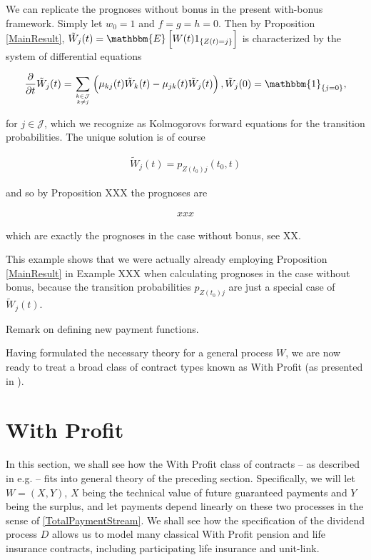 \documentclass{book}
\newcommand{\1}[1]{\mathbbm{1}_{\left\lbrace #1 \right\rbrace}}
\newcommand{\expec}[1][def]{\mathbbm{E} \left[ #1 \right]}
\theoremstyle{break}
\theoremstyle{remark}
\newenvironment{remark}
  {\pushQED{\qed}\renewcommand{\qedsymbol}{\scalebox{1.4}{$\circ$}}\remarkx}
  {\popQED\endremarkx}
\numberwithin{equation}{section}
\begin{document}
\begin{remark} \label{WithoutBonusAsSpecialCase}
	We can replicate the prognoses without bonus in the present with-bonus framework. Simply let $w_0=1$ and $f=g=h=0$. Then by Proposition \ref{MainResult}, $\tilde{W}_j(t)=\expec[W(t) 1_{\{Z(t)=j\}}]$ is characterized by the system of differential equations
	
	\begin{align*}
	\frac{\partial}{\partial t} \tilde{W}_j(t) = \sum_{k \in \mathcal{J} \atop k \neq j} \left( \mu_{kj}(t) \tilde{W}_k(t) - \mu_{jk}(t) \tilde{W}_j(t) \right), \tilde{W}_j(0) = \1{j=0},
	\end{align*}
	
	for $j \in \mathcal{J}$, which we recognize as Kolmogorovs forward equations for the transition probabilities. The unique solution is of course
	
	\begin{align*}
	\tilde{W}_j(t) = p_{Z(t_0)j}(t_0,t)
	\end{align*}
	
	and so by Proposition XXX the prognoses are
	
	\begin{align*}
		xxx
	\end{align*}
	
	which are exactly the prognoses in the case without bonus, see XX.
	
	This example shows that we were actually already employing Proposition \ref{MainResult} in Example XXX when calculating prognoses in the case without bonus, because the transition probabilities $p_{Z(t_0)j}$ are just a special case of $\tilde{W}_j(t)$.
\end{remark}

Remark on defining new payment functions.

Having formulated the necessary theory for a general process $W$, we are now ready to treat a broad class of contract types known as With Profit (as presented in \cite{Liv2Bog}).

\section{With Profit}
In this section, we shall see how the With Profit class of contracts -- as described in e.g. \cite{Liv2Bog} -- fits into general theory of the preceding section. Specifically, we will let $W=(X,Y)$, $X$ being the technical value of future guaranteed payments and $Y$ being the surplus, and let payments depend linearly on these two processes in the sense of \ref{TotalPaymentStream}. We shall see how the specification of the dividend process $D$ allows us to model many classical With Profit pension and life insurance contracts, including participating life insurance and unit-link.
\end{document}
